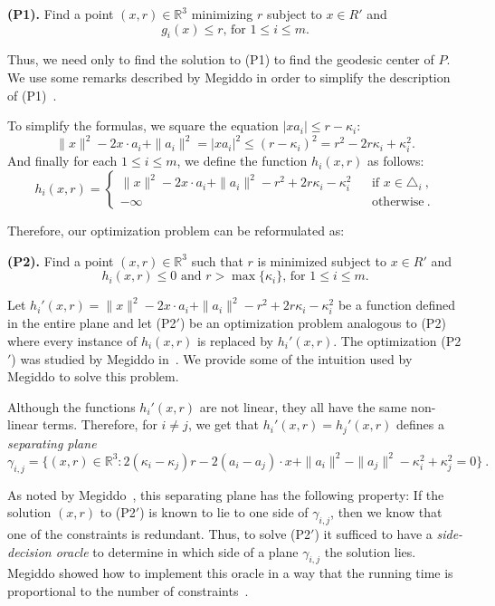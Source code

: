 \documentclass[a4paper,UKenglish]{lipics}
\newcommand{\reg}{\ensuremath{R'}}
\begin{document}
\textbf{(P1).} Find a point $(x,r)\in \mathbb{R}^3$ minimizing $r$ subject to $x\in \reg$ and
$$\text{$g_i(x) \leq r$, for $1\leq i \leq m$}.$$

Thus, we need only to find the solution to (P1) to find the geodesic center of $P$.
We use some remarks described by Megiddo in order to simplify the description of (P1)~\cite{megiddo1989ball}.

To simplify the formulas, we square the equation $|x a_i| \leq r - \kappa_i$:
$$\|x\|^2 - 2x\cdot a_i + \|a_i\|^2  = |x a_i|^2 \leq (r - \kappa_i)^2 = r^2 - 2r\kappa_i + \kappa_i^2.$$ 
And finally for each $1\leq i\leq m$, we define the function $h_i(x, r)$ as follows:
$$h_i(x, r) = \left\{ \begin{array}{lll}
 \|x\|^2 - 2x\cdot a_i + \|a_i\|^2  - r^2 + 2r\kappa_i - \kappa_i^2 && \text{if }x\in \triangle_i\ ,\\
-\infty&&\text{otherwise}\ .
\end{array}\right. $$

Therefore, our optimization problem can be reformulated as:

\textbf{(P2).} Find a point $(x,r)\in \mathbb{R}^3$ such that $r$ is minimized subject to $x\in \reg$ and 
$$h_i(x, r) \leq 0 \text{ and  $r > \max\{\kappa_i\}$, for $1\leq i \leq m$}.$$

Let $h_i'(x,r) = \|x\|^2 - 2x\cdot a_i + \|a_i\|^2  - r^2 + 2r\kappa_i - \kappa_i^2$ be a function defined in the entire plane and let (P2$'$) be an optimization problem analogous to (P2) where every instance of $h_i(x,r)$ is replaced by $h_i'(x,r)$.
The optimization (P2$'$) was studied by Megiddo in~\cite{megiddo1989ball}. We provide some of the intuition used by Megiddo to solve this problem.

Although the functions $h_i'(x,r)$ are not linear, they all have the same non-linear terms. Therefore, for $i\neq j$, we get that
$h_i'(x,r) = h_j'(x, r)$ defines a \emph{separating plane}
$$\gamma_{i,j} = \{(x, r) \in \mathbb{R}^3:  2( \kappa_i - \kappa_j) r - 2 (a_i - a_j) \cdot x + \|a_i\|^2 - \|a_j\|^2 - \kappa_i^2 + \kappa_j^2 = 0\}\ .$$

As noted by Megiddo~\cite{megiddo1989ball}, this separating plane has the following property:
If the solution $(x, r)$ to (P2$'$) is known to lie to one side of $\gamma_{i,j}$, then we know that one of the constraints is redundant. 
Thus, to solve (P2$'$) it sufficed to have a \emph{side-decision oracle} to determine in which side of a plane $\gamma_{i,j}$ the solution lies. Megiddo showed how to implement this oracle in a way that the running time is proportional to the number of constraints~\cite{megiddo1989ball}.
\end{document}
